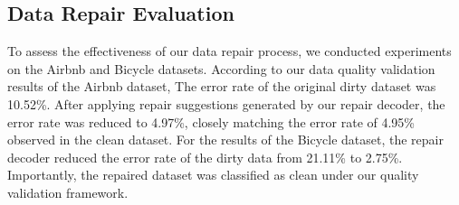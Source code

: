 




\subsection{Data Repair Evaluation}
To assess the effectiveness of our data repair process, we conducted experiments on the Airbnb and Bicycle datasets. 
According to our data quality validation results of the Airbnb dataset, The error rate of the original dirty dataset was 10.52\%. 
After applying repair suggestions generated by our repair decoder, the error rate was reduced to 4.97\%, closely matching the error rate of 4.95\% observed in the clean dataset. 
For the results of the Bicycle dataset, the repair decoder reduced the error rate of the dirty data from 21.11\% to 2.75\%. 
Importantly, the repaired dataset was classified as clean under our quality validation framework. 



